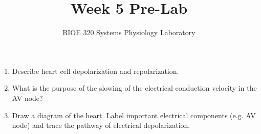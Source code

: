 \documentclass{article}
\title{Week 5 Pre-Lab}
\author{BIOE 320 Systems Physiology Laboratory}
\date{}
\begin{document}
\maketitle
\large

\begin{enumerate}
	\item Describe heart cell depolarization and repolarization.
	\item What is the purpose of the slowing of the electrical conduction velocity in the AV node?
	\item Draw a diagram of the heart. Label important electrical components (e.g. AV node) and trace the pathway of electrical depolarization.
\end{enumerate}
\end{document}
